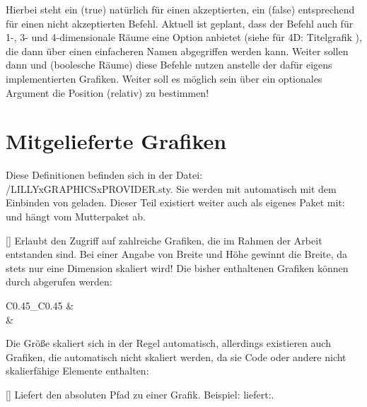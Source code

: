Hierbei steht ein  (true) natürlich für einen akzeptierten, ein  (false) entsprechend für einen nicht akzeptierten Befehl. Aktuell ist geplant, dass der Befehl auch für 1-, 3- und 4-dimensionale Räume eine Option anbietet (siehe für 4D: Titelgrafik \gdra[]), die dann über einen einfacheren Namen abgegriffen werden kann. Weiter sollen dann \fg und \gdra (boolesche Räume) diese Befehle nutzen anstelle der dafür eigens implementierten Grafiken. Weiter soll es möglich sein über ein optionales Argument die Position (relativ) zu bestimmen!
%
%
%
\section{Mitgelieferte Grafiken}
Diese Definitionen befinden sich in der Datei: {\ltt\LILLYxPATHxGRAPHICS/LILLYxGRAPHICSxPROVIDER.sty}. Sie werden mit  automatisch mit dem Einbinden von\newline {} geladen.\medskip\newline
Dieser Teil existiert weiter auch als eigenes Paket mit:  und hängt vom Mutterpaket ab. 

[]
Erlaubt den Zugriff auf zahlreiche Grafiken, die im Rahmen der Arbeit entstanden sind. Bei einer Angabe von Breite und Höhe gewinnt die Breite, da stets nur eine Dimension skaliert wird! Die bisher enthaltenen Grafiken können durch  abgerufen werden: \begin{center}
    \begin{tabular}{C{0.45\linewidth}_C{0.45\linewidth}}
         &  \\
        \tiny {} & \tiny{}
    \end{tabular}
\end{center}
Die Größe skaliert sich in der Regel automatisch, allerdings existieren auch Grafiken, die automatisch nicht skaliert werden, da sie Code oder andere nicht skalierfähige Elemente enthalten: \begin{center}
\end{center}

[]
Liefert den absoluten Pfad zu einer Grafik. Beispiel:  liefert:\newline {}. 

